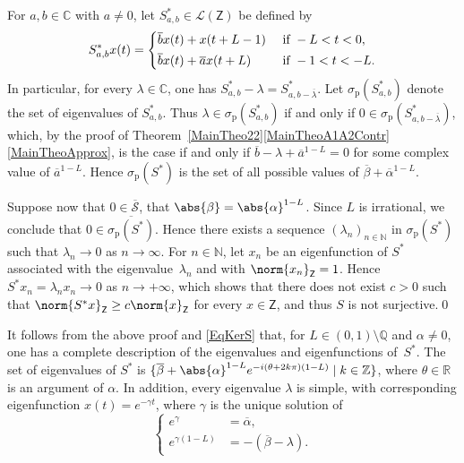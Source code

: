 For $a, b \in \mathbb C$ with $a \neq 0$, let $S_{a, b}^\ast \in \mathcal L(\mathsf Z)$ be defined by
\[
S_{a, b}^\ast x(t) =
\begin{dcases}
\overline b x(t) + x(t + L - 1) & \text{ if } -L < t < 0, \\
\overline b x(t) + \overline a x(t + L) & \text{ if } -1 < t < -L.
\end{dcases}
\]
In particular, for every $\lambda \in \mathbb C$, one has $S_{a, b}^\ast - \lambda = S_{a, b - \overline\lambda}^\ast$. Let $\sigma_{\mathrm p}(S_{a, b}^\ast)$ denote the set of eigenvalues of $S_{a, b}^\ast$. Thus $\lambda \in \sigma_{\mathrm p}(S_{a, b}^\ast)$ if and only if $0 \in \sigma_{\mathrm p}(S_{a, b - \overline\lambda}^\ast)$, which, by the proof of Theorem~\ref{MainTheo22}\eqref{MainTheoA1A2Contr}\eqref{MainTheoApprox}, is the case if and only if $\overline b - \lambda + \overline a^{1-L} = 0$ for some complex value of $\overline a^{1-L}$. Hence $\sigma_{\mathrm p}(S^\ast)$ is the set of all possible values of $\overline\beta + \overline\alpha^{1-L}$.

Suppose now that $0 \in \overline{\mathcal S}$, \ie that $\abs{\beta} = \abs{\alpha}^{1-L}$. Since $L$ is irrational, we conclude that $0 \in \overline{\sigma_{\mathrm p}(S^\ast)}$. Hence there exists a sequence $(\lambda_n)_{n \in \mathbb N}$ in $\sigma_{\mathrm p}(S^\ast)$ such that $\lambda_n \to 0$ as $n \to \infty$. For $n \in \mathbb N$, let $x_n$ be an eigenfunction of $S^\ast$ associated with the eigenvalue~$\lambda_n$ and with $\norm{x_n}_{\mathsf Z} = 1$. Hence $S^\ast x_n = \lambda_n x_n \to 0$ as $n \to +\infty$, which shows that there does not exist $c > 0$ such that $\norm{S^\ast x}_{\mathsf Z} \geq c \norm{x}_{\mathsf Z}$ for every $x \in \mathsf Z$, and thus $S$ is not surjective.\qed

\begin{remk}
\label{RemkEigenpairsS}
It follows from the above proof and \eqref{EqKerS} that, for $L \in (0, 1) \setminus \mathbb Q$ and $\alpha \neq 0$, one has a complete description of the eigenvalues and eigenfunctions of~$S^\ast$. The set of eigenvalues of $S^\ast$ is $\{\overline\beta + \abs{\alpha}^{1 - L} e^{- i (\theta + 2 k \pi)(1 - L)} \mid k \in \mathbb Z\}$, where $\theta \in \mathbb R$ is an argument of $\alpha$. In addition, every eigenvalue $\lambda$ is simple, with corresponding eigenfunction $x(t) = e^{- \gamma t}$, where $\gamma$ is the unique solution of
\[
\left\{
\begin{aligned}
e^{\gamma} & = \overline\alpha, \\
e^{\gamma(1 - L)} & = - (\overline\beta - \lambda).
\end{aligned}
\right.
\]
\end{remk}


